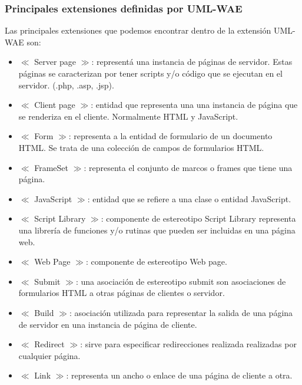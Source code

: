 \subsubsection{Principales extensiones definidas por UML-WAE}

Las principales extensiones que podemos encontrar dentro de la extensión UML-WAE son:
\begin{itemize}
\item $\ll$ Server page $\gg$: representá una instancia de páginas de servidor. Estas páginas se caracterizan por tener scripts y/o código que se ejecutan en el servidor. (.php, .asp, .jsp).
\item $\ll$ Client page $\gg$: entidad que representa una una instancia de página que se renderiza en el cliente. Normalmente HTML y JavaScript.
\item $\ll$ Form $\gg$: representa a la entidad de formulario de un documento HTML. Se trata de una colección de campos de formularios HTML.
\item $\ll$ FrameSet $\gg$: representa el conjunto de marcos o frames que tiene una página.
\item $\ll$ JavaScript $\gg$: entidad que se refiere a una clase o entidad JavaScript.
\item $\ll$ Script Library $\gg$: componente de estereotipo Script Library representa una librería de funciones y/o rutinas que pueden ser incluidas en una página web.
\item $\ll$ Web Page $\gg$: componente de estereotipo Web page.
\item $\ll$ Submit $\gg$: una asociación de estereotipo submit son asociaciones de formularios HTML a otras páginas de clientes o servidor.
\item $\ll$ Build $\gg$: asociación utilizada para representar la salida de una página de servidor en una instancia de página de cliente.
\item $\ll$ Redirect $\gg$: sirve para especificar redirecciones realizada realizadas por cualquier página.
\item $\ll$ Link $\gg$: representa un ancho o enlace de una página de cliente a otra.
\end{itemize}
